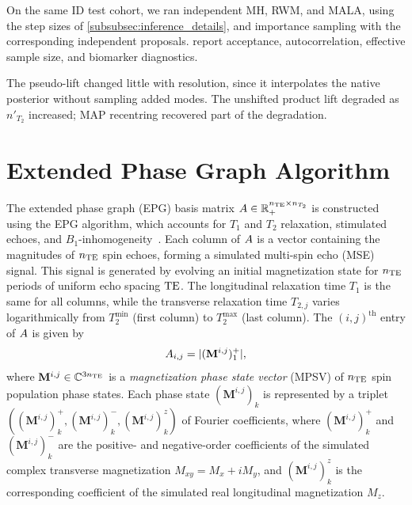 On the same ID test cohort, we ran independent \gls*{MH}, \gls*{RWM}, and \gls*{MALA}, using the step sizes of \cref{subsubsec:inference_details}, and importance sampling with the corresponding independent proposals.
 report acceptance, autocorrelation, effective sample size, and biomarker diagnostics.

The pseudo-lift changed little with resolution, since it interpolates the native posterior without sampling added modes.
The unshifted product lift degraded as $n'_{T_2}$ increased;
\gls*{MAP} recentring recovered part of the degradation.

\section{Extended Phase Graph Algorithm}\label{sec:apx:epg_basis}

The extended phase graph (\gls*{EPG}) basis matrix $A \in \mathbb{R}_+^{n_{\mathrm{TE}} \times n_{T_2}}$ is constructed using the \gls*{EPG} algorithm, which accounts for $T_1$ and $T_2$ relaxation, stimulated echoes, and $B_1$-inhomogeneity~\citep{hennig_multiecho_1988,prasloski_applications_2012}.
Each column of $A$ is a vector containing the magnitudes of $n_{\mathrm{TE}}$ spin echoes, forming a simulated multi-spin echo (\gls*{MSE}) signal.
This signal is generated by evolving an initial magnetization state for $n_{\mathrm{TE}}$ periods of uniform echo spacing $\mathrm{TE}$.
The longitudinal relaxation time $T_1$ is the same for all columns, while the transverse relaxation time $T_{2,j}$ varies logarithmically from $T_2^{\min}$ (first column) to $T_2^{\max}$ (last column).
The $(i,j)^{\text{th}}$ entry of $A$ is given by
\begin{align}\label{eqn:epg_basis_definition}
    A_{i,j} = \lvert (\mathbf{M}^{i,j})_1^+ \rvert,
\end{align}
where $\mathbf{M}^{i,j} \in \mathbb{C}^{3 n_{\mathrm{TE}}}$ is a \textit{magnetization phase state vector} (\gls*{MPSV}) of $n_{\mathrm{TE}}$ spin population phase states.
Each phase state $(\mathbf{M}^{i,j})_{k}$ is represented by a triplet $((\mathbf{M}^{i,j})_k^+, (\mathbf{M}^{i,j})_k^-, (\mathbf{M}^{i,j})_k^z)$ of Fourier coefficients, where $(\mathbf{M}^{i,j})_k^+$ and $(\mathbf{M}^{i,j})_k^-$ are the positive- and negative-order coefficients of the simulated complex transverse magnetization $M_{xy} = M_x + i M_y$, and $(\mathbf{M}^{i,j})_k^z$ is the corresponding coefficient of the simulated real longitudinal magnetization $M_z$.

